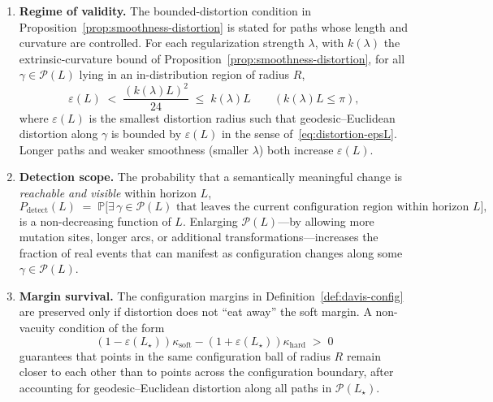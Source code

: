 \documentclass[11pt]{article}
\theoremstyle{remark}
\theoremstyle{plain}
\begin{document}
\begin{enumerate}[label=(R\arabic*), leftmargin=*]
  \item \textbf{Regime of validity.} The bounded-distortion condition in Proposition~\ref{prop:smoothness-distortion}
  is stated for paths whose length and curvature are controlled.
  For each regularization strength $\lambda$, with $k(\lambda)$ the extrinsic-curvature bound of Proposition~\ref{prop:smoothness-distortion},
  for all $\gamma \in \mathcal{P}(L)$ lying in an in-distribution region of radius $R$,
  \begin{equation}
    \label{eq:epsL-scaling}
    \varepsilon(L) \;<\; \frac{(k(\lambda) L)^2}{24} \;\le\; k(\lambda) L \qquad (k(\lambda)L \le \pi),
  \end{equation}
  where $\varepsilon(L)$ is the smallest distortion radius such that geodesic--Euclidean
  distortion along $\gamma$ is bounded by $\varepsilon(L)$ in the sense of~\eqref{eq:distortion-epsL}.
  Longer paths and weaker smoothness (smaller $\lambda$) both increase $\varepsilon(L)$.

  \item \textbf{Detection scope.} The probability that a semantically meaningful change is
  \emph{reachable and visible} within horizon $L$,
  \[
  P_{\mathrm{detect}}(L) \;=\; \mathbb{P}\big[\exists\,\gamma \in \mathcal{P}(L)
    \text{ that leaves the current configuration region within horizon }L\big],
  \]
  is a non-decreasing function of $L$. Enlarging $\mathcal{P}(L)$---by allowing more mutation sites,
  longer arcs, or additional transformations---increases the fraction of real events that can
  manifest as configuration changes along some $\gamma \in \mathcal{P}(L)$.

  \item \textbf{Margin survival.} The configuration margins in
  Definition~\ref{def:davis-config} are preserved only if distortion does not ``eat away'' the soft
  margin. A non-vacuity condition of the form
  \begin{equation}
    \label{eq:non-vac-path}
    (1-\varepsilon(L_\star))\kappa_{\mathrm{soft}} - (1+\varepsilon(L_\star))\kappa_{\mathrm{hard}} \;>\; 0
  \end{equation}
  guarantees that points in the same configuration ball of radius $R$ remain closer to each other
  than to points across the configuration boundary, after accounting for geodesic--Euclidean
  distortion along all paths in $\mathcal{P}(L_\star)$.
\end{enumerate}
\end{document}

